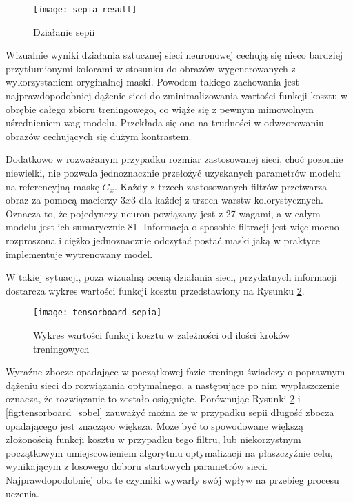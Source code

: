     \begin{figure}[H]
      \centering
      \texttt{[image: sepia\_result]}
      \caption[Działanie sepii - źródło: Praca własna]{Działanie sepii}
      \label{fig:sepia_result}
    \end{figure}

    Wizualnie wyniki działania sztucznej sieci neuronowej cechują się nieco bardziej
    przytłumionymi kolorami w stosunku do obrazów wygenerowanych z wykorzystaniem
    oryginalnej maski. Powodem takiego zachowania jest najprawdopodobniej dążenie
    sieci do zminimalizowania wartości funkcji kosztu w obrębie całego zbioru
    treningowego, co wiąże się z pewnym mimowolnym uśrednieniem wag modelu. Przekłada
    się ono na trudności w odwzorowaniu obrazów cechujących się dużym kontrastem.

    Dodatkowo w rozważanym przypadku rozmiar zastosowanej sieci, choć pozornie
    niewielki, nie pozwala jednoznacznie przełożyć uzyskanych parametrów modelu na
    referencyjną maskę $G_x$. Każdy z trzech zastosowanych filtrów przetwarza
    obraz za pomocą macierzy $3x3$ dla każdej z trzech warstw kolorystycznych.
    Oznacza to, że pojedynczy neuron powiązany jest z 27 wagami, a w całym modelu
    jest ich sumarycznie 81. Informacja o sposobie filtracji jest więc mocno
    rozproszona i ciężko jednoznacznie odczytać postać maski jaką w praktyce
    implementuje wytrenowany model.

    W takiej sytuacji, poza wizualną oceną działania sieci, przydatnych informacji
    dostarcza wykres wartości funkcji kosztu przedstawiony na Rysunku \ref{fig:tensorboard_sepia}.

    \begin{figure}[H]
      \centering
      \texttt{[image: tensorboard\_sepia]}
      \caption[Wykres wartości funkcji kosztu w zależności od ilości kroków treningowych - źródło: Praca własna]{Wykres wartości funkcji kosztu w zależności od ilości kroków treningowych}
      \label{fig:tensorboard_sepia}
    \end{figure}

    Wyraźne zbocze opadające w początkowej fazie treningu świadczy o poprawnym dążeniu
    sieci do rozwiązania optymalnego, a następujące po nim wypłaszczenie oznacza, że
    rozwiązanie to zostało osiągnięte. Porównując Rysunki \ref{fig:tensorboard_sepia}
    i \ref{fig:tensorboard_sobel} zauważyć można że w przypadku sepii długość zbocza
    opadającego jest znacząco większa. Może być to spowodowane większą złożonością
    funkcji kosztu w przypadku tego filtru, lub niekorzystnym początkowym umiejscowieniem
    algorytmu optymalizacji na płaszczyźnie celu, wynikającym z losowego doboru startowych parametrów sieci.
    Najprawdopodobniej oba te czynniki wywarły swój wpływ na przebieg procesu uczenia.

